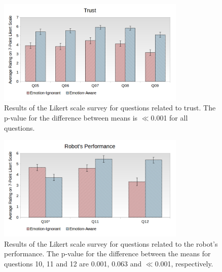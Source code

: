 \documentclass[12pt]{report}
\begin{document}
\begin{figure}[h]
\centering
\includegraphics[width=0.8\textwidth]{figure/Overall-Trust.png}
\caption{Results of the Likert scale survey for questions related to trust. The
p-value for the difference between means is $\ll$0.001 for all questions.}
\label{fig:overall-trust}
\end{figure}

\begin{figure}[h]
\centering
\includegraphics[width=0.8\textwidth]{figure/Overall-Performance.png}
\vspace*{-5mm}
\caption{Results of the Likert scale survey for questions related to the robot's
performance. The p-value for the difference between the means for questions 10,
11 and 12 are 0.001, 0.063 and $\ll$0.001, respectively.}
\label{fig:overall-performance}
\end{figure}
\end{document}

